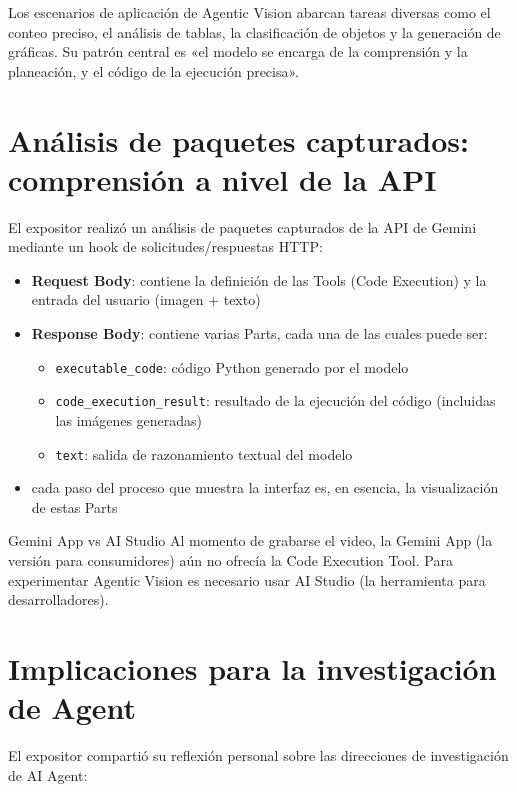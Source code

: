 \documentclass[a4paper]{article}
\begin{document}
Los escenarios de aplicación de Agentic Vision abarcan tareas diversas como el conteo preciso, el análisis de tablas, la clasificación de objetos y la generación de gráficas. Su patrón central es «el modelo se encarga de la comprensión y la planeación, y el código de la ejecución precisa».

\section{Análisis de paquetes capturados: comprensión a nivel de la API}

El expositor realizó un análisis de paquetes capturados de la API de Gemini mediante un hook de solicitudes/respuestas HTTP:

\begin{itemize}
    \item \textbf{Request Body}: contiene la definición de las Tools (Code Execution) y la entrada del usuario (imagen + texto)
    \item \textbf{Response Body}: contiene varias Parts, cada una de las cuales puede ser:
    \begin{itemize}
        \item \texttt{executable\_code}: código Python generado por el modelo
        \item \texttt{code\_execution\_result}: resultado de la ejecución del código (incluidas las imágenes generadas)
        \item \texttt{text}: salida de razonamiento textual del modelo
    \end{itemize}
    \item cada paso del proceso que muestra la interfaz es, en esencia, la visualización de estas Parts
\end{itemize}

\begin{knowledgebox}{Gemini App vs AI Studio}
Al momento de grabarse el video, la Gemini App (la versión para consumidores) aún no ofrecía la Code Execution Tool. Para experimentar Agentic Vision es necesario usar AI Studio (la herramienta para desarrolladores).
\end{knowledgebox}

\section{Implicaciones para la investigación de Agent}

El expositor compartió su reflexión personal sobre las direcciones de investigación de AI Agent:
\end{document}

